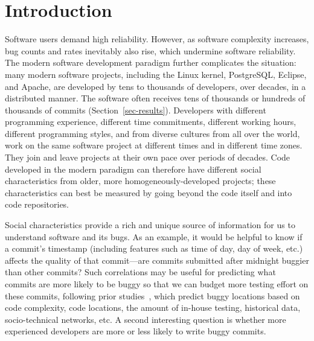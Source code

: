 
\section{Introduction}

Software users demand high reliability. However, as software complexity
increases, bug counts and rates inevitably also rise, which undermine software
reliability.  The modern software development paradigm further complicates the
situation: many modern software projects, including the Linux kernel,
PostgreSQL, Eclipse, and Apache, are developed by tens to thousands of
developers, over decades, in a distributed manner. The software often receives
tens of thousands or hundreds of thousands of commits
(Section~\ref{sec-results}).  Developers with different programming experience,
different time commitments, different working hours, different programming
styles, and from diverse cultures from all over the world, work on the same
software project at different times and in different time zones. They join and
leave projects at their own pace over periods of decades.  Code developed in the
modern paradigm can therefore have different social characteristics from older,
more homogeneously-developed projects; these characteristics can best be
measured by going beyond the code itself and into code repositories.

Social characteristics provide a rich and unique source of information for us to
understand software and its bugs. As an example, it would be helpful to know if
a commit's timestamp (including features such as time of day, day of week, etc.)
affects the quality of that commit---are commits submitted after midnight
buggier than other commits?  Such correlations may be useful for predicting what
commits are more likely to be buggy so that we can budget more testing effort on
these commits, following prior studies~\cite{graves00predicting, guo04robust,
Hassan09, libre07, devNetwork08, predictionMenzies10, effort03,
ostrand05predicting, depGraph08, zimmermann-promise-2007}, which predict buggy
locations based on code complexity, code locations, the amount of in-house
testing, historical data, socio-technical networks, etc.  A second interesting
question is whether more experienced developers are more or less likely to write
buggy commits.


